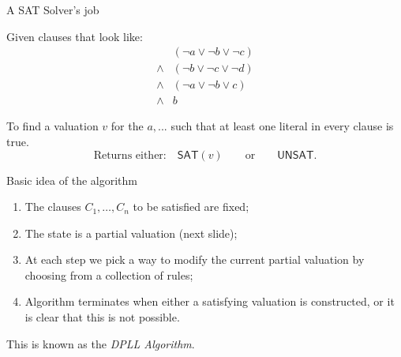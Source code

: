 \documentclass[xetex,aspectratio=169,14pt,hyperref={pdfpagelabels=true,pdflang={en-GB}}]{beamer}
\begin{document}
\begin{frame}
  {A SAT Solver's job}

  Given clauses that look like:
  \begin{displaymath}
    \begin{array}{cl}
      &(\lnot a \lor \lnot b \lor \lnot c) \\
      \land&(\lnot b \lor \lnot c \lor \lnot d) \\
      \land&(\lnot a \lor \lnot b \lor c) \\
      \land&b
    \end{array}
  \end{displaymath}

  To find a valuation $v$ for the $a, ...$ such that at least one
  literal in every clause is true.
  \begin{displaymath}
    \textrm{Returns either:} \quad \mathsf{SAT}(v) \qquad \textrm{or} \qquad \mathsf{UNSAT}.
  \end{displaymath}
\end{frame}

\begin{frame}
  {Basic idea of the algorithm}

  \begin{enumerate}
  \item The clauses $C_1, \dots, C_n$ to be satisfied are fixed;
  \item The state is a partial valuation \textcolor{black!60}{(next slide)};
  \item At each step we pick a way to modify the current partial
    valuation by choosing from a collection of rules;
  \item Algorithm terminates when either a satisfying valuation is
    constructed, or it is clear that this is not possible.
  \end{enumerate}

  \bigskip

  This is known as the \emph{DPLL Algorithm}.
\end{frame}
\end{document}
